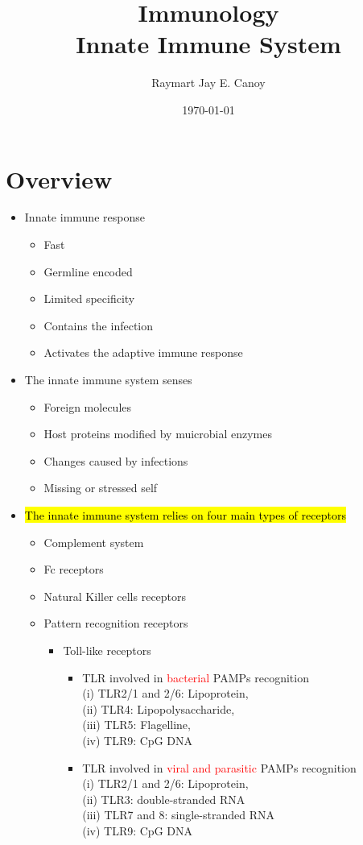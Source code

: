 \documentclass[a4paper, 12pt]{article}
\begin{document}
\title{\textbf{Immunology} \\ \textbf{Innate Immune System}}
\author{Raymart Jay E. Canoy}
\date{\today}
\maketitle

\section{Overview}
\begin{itemize}
\item{Innate immune response}
\begin{itemize}
\item{Fast}
\item{Germline encoded}
\item{Limited specificity}
\item{Contains the infection}
\item{Activates the adaptive immune response}
\end{itemize}

\item{The innate immune system senses}
\begin{itemize}
\item{Foreign molecules}
\item{Host proteins modified by muicrobial enzymes}
\item{Changes caused by infections}
\item{Missing or stressed self}
\end{itemize}

\item{\hl{The innate immune system relies on four main types of receptors}}
\begin{itemize}
\item{Complement system}
\item{Fc receptors}
\item{Natural Killer cells receptors}
\item{Pattern recognition receptors}
\begin{itemize}
\item{Toll-like receptors}
\begin{itemize}
\item{TLR involved in \textcolor{red}{bacterial} PAMPs recognition}\\
(i) TLR2/1 and 2/6: Lipoprotein, \\
(ii) TLR4: Lipopolysaccharide, \\
(iii) TLR5: Flagelline, \\
(iv) TLR9: CpG DNA
\item{TLR involved in \textcolor{red}{viral and parasitic} PAMPs recognition} \\
(i) TLR2/1 and 2/6: Lipoprotein, \\
(ii) TLR3: double-stranded RNA \\
(iii) TLR7 and 8: single-stranded RNA\\
(iv) TLR9: CpG DNA
\end{itemize}
\end{itemize}
\end{itemize}


\end{itemize}
\end{document}
